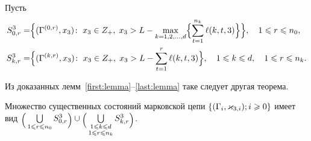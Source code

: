 Пусть
\begin{align*}
  S^3_{0, r} = & 
  \Bigl\{
  (\Gamma^{(0,  r)},  x_3) \colon \; x_3\in Z_+, \; x_3 > L - \max\limits_{k=1,  2, 
    \ldots,  d}
  \Bigl\{ \sum_{t=1}^{n_k} \ell({k,  t,  3}) \Bigl\}\Bigl\},  
  \quad 1 \leqslant r \leqslant n_0,  \\
  S^3_{k,  r} = & 
  \Bigl\{
  (\Gamma^{(k,  r)},  x_3) \colon \; x_3\in Z_+, \; x_3 > L - \sum_{t=1}^{r} \ell({k,  t,  3})
  \Bigr\},  
  \quad 1 \leqslant k \leqslant d,  \quad 1 \leqslant r \leqslant n_k.
\end{align*}

Из доказанных лемм~\ref{first:lemma}--\ref{last:lemma} таке следует другая теорема.
\begin{theorem}
Множество существенных состояний марковской цепи $\MarkThree$ имеет вид $\raisebox{-.5ex}{$\Bigl($}\bigcup\limits_{1 \leqslant r \leqslant n_0}S^3_{0, r}\raisebox{-.5ex}{$\Bigr)$}\cup \raisebox{-.5ex}{$\Bigl($}\bigcup\limits_{\substack{1 \leqslant k \leqslant d\\ 1 \leqslant r \leqslant n_k}} S^3_{k, r}\raisebox{-.5ex}{$\Bigr)$}$.
\end{theorem}




